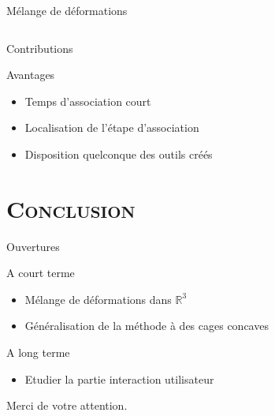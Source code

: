 \documentclass[xcolor=x11names,compress]{beamer}
\renewcommand{\(}{\begin{columns}} \renewcommand{\)}{\end{columns}}
\newcommand{\<}[1]{\begin{column}{#1}} \renewcommand{\>}{\end{column}}
\begin{document}
\begin{frame}{Mélange de déformations}
\begin{columns}[t]
\begin{column}{0.5\textwidth}
    \end{column}
  \end{columns}
\end{frame}

\begin{frame}{Contributions}
  \begin{exampleblock}{Avantages}
    \begin{itemize}
      \item Temps d'association court
      \item Localisation de l'étape d'association
      \item Disposition quelconque des outils créés
    \end{itemize}
  \end{exampleblock}
\end{frame}


\section{\scshape Conclusion}

\begin{frame}{Ouvertures}
  \begin{block}{A court terme}
    \begin{itemize}
      \item Mélange de déformations dans $\mathbb{R}^3$
      \item Généralisation de la méthode à des cages concaves
    \end{itemize}
  \end{block}
  \begin{block}{A long terme}
    \begin{itemize}
      \item Etudier la partie interaction utilisateur
    \end{itemize}
  \end{block}
\end{frame}

\begin{frame}{}
\begin{center}
\huge Merci de votre attention.
\end{center}
\end{frame}

\appendix
\end{document}
